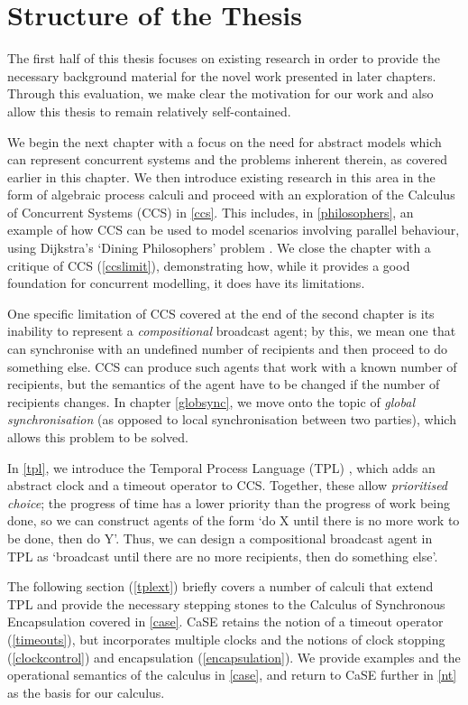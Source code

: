 \section{Structure of the Thesis}

The first half of this thesis focuses on existing research in order to
provide the necessary background material for the novel work presented
in later chapters.  Through this evaluation, we make clear the
motivation for our work and also allow this thesis to remain
relatively self-contained.  

We begin the next chapter with a focus on the need for abstract models
which can represent concurrent systems and the problems inherent
therein, as covered earlier in this chapter.  We then introduce
existing research in this area in the form of algebraic process
calculi and proceed with an exploration of the Calculus of Concurrent
Systems (CCS) \cite{milner:ccs} in \ref{ccs}.  This includes, in
\ref{philosophers}, an example of how CCS can be used to model
scenarios involving parallel behaviour, using Dijkstra's
`Dining Philosophers' problem \cite{dijkstra:philosophers}.  We close
the chapter with a critique of CCS (\ref{ccslimit}), demonstrating
how, while it provides a good foundation for concurrent modelling, it
does have its limitations.

One specific limitation of CCS covered at the end of the second
chapter is its inability to represent a \emph{compositional} broadcast
agent; by this, we mean one that can synchronise with an undefined
number of recipients and then proceed to do something else.  CCS can
produce such agents that work with a known number of recipients, but
the semantics of the agent have to be changed if the number of
recipients changes.  In chapter \ref{globsync}, we move onto the topic
of \emph{global synchronisation} (as opposed to local synchronisation
between two parties), which allows this problem to be solved.

In \ref{tpl}, we introduce the Temporal Process Language (TPL)
\cite{hennessy:tpl}, which adds an abstract clock and a timeout
operator to CCS.  Together, these allow \emph{prioritised choice}; the
progress of time has a lower priority than the progress of work being
done, so we can construct agents of the form `do X until there is no
more work to be done, then do Y'.  Thus, we can design a compositional
broadcast agent in TPL as `broadcast until there are no more
recipients, then do something else'.

The following section (\ref{tplext}) briefly covers a number of
calculi that extend TPL and provide the necessary stepping stones to
the Calculus of Synchronous Encapsulation \cite{CaSE} covered in
\ref{case}.  CaSE retains the notion of a timeout operator
(\ref{timeouts}), but incorporates multiple clocks and the notions of
clock stopping (\ref{clockcontrol}) and encapsulation
(\ref{encapsulation}).  We provide examples and the operational
semantics of the calculus in \ref{case}, and return to CaSE further in
\ref{nt} as the basis for our calculus.

